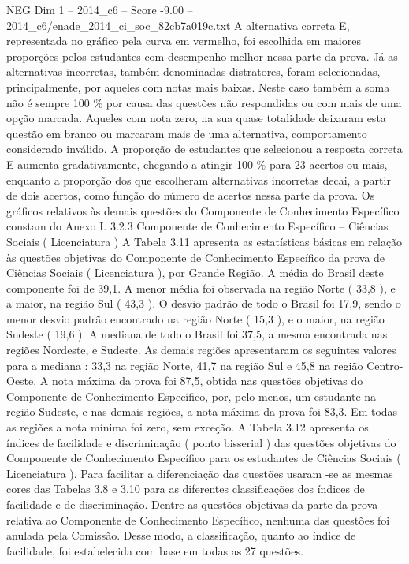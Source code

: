 \begin{textsample}{NEG Dim 1 – 2014\_c6 – Score -9.00 – 2014\_c6/enade\_2014\_ci\_soc\_82cb7a019c.txt}
A alternativa correta E, representada no gráfico pela curva em vermelho, foi escolhida em maiores proporções pelos estudantes com desempenho melhor nessa parte da prova.
Já as alternativas incorretas, também denominadas distratores, foram selecionadas, principalmente, por aqueles com notas mais baixas.
Neste caso também a soma não é sempre 100 \% por causa das questões não respondidas ou com mais de uma opção marcada.
Aqueles com nota zero, na sua quase totalidade deixaram esta questão em branco ou marcaram mais de uma alternativa, comportamento considerado inválido.
A proporção de estudantes que selecionou a resposta correta E aumenta gradativamente, chegando a atingir 100 \% para 23 acertos ou mais, enquanto a proporção dos que escolheram alternativas incorretas decai, a partir de dois acertos, como função do número de acertos nessa parte da prova.
Os gráficos relativos às demais questões do Componente de Conhecimento Específico constam do Anexo I. 3.2.3 Componente de Conhecimento Específico – Ciências Sociais ( Licenciatura ) A Tabela 3.11 apresenta as estatísticas básicas em relação às questões objetivas do Componente de Conhecimento Específico da prova de Ciências Sociais ( Licenciatura ), por Grande Região.
A média do Brasil deste componente foi de 39,1.
A menor média foi observada na região Norte ( 33,8 ), e a maior, na região Sul ( 43,3 ).
O desvio padrão de todo o Brasil foi 17,9, sendo o menor desvio padrão encontrado na região Norte ( 15,3 ), e o maior, na região Sudeste ( 19,6 ).
A mediana de todo o Brasil foi 37,5, a mesma encontrada nas regiões Nordeste, e Sudeste.
As demais regiões apresentaram os seguintes valores para a mediana : 33,3 na região Norte, 41,7 na região Sul e 45,8 na região Centro-Oeste.
A nota máxima da prova foi 87,5, obtida nas questões objetivas do Componente de Conhecimento Específico, por, pelo menos, um estudante na região Sudeste, e nas demais regiões, a nota máxima da prova foi 83,3.
Em todas as regiões a nota mínima foi zero, sem exceção.
A Tabela 3.12 apresenta os índices de facilidade e discriminação ( ponto bisserial ) das questões objetivas do Componente de Conhecimento Específico para os estudantes de Ciências Sociais ( Licenciatura ).
Para facilitar a diferenciação das questões usaram -se as mesmas cores das Tabelas 3.8 e 3.10 para as diferentes classificações dos índices de facilidade e de discriminação.
Dentre as questões objetivas da parte da prova relativa ao Componente de Conhecimento Específico, nenhuma das questões foi anulada pela Comissão.
Desse modo, a classificação, quanto ao índice de facilidade, foi estabelecida com base em todas as 27 questões.

\end{textsample}
